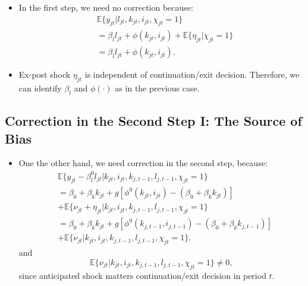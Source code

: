 \documentclass[
]{book}
\providecommand{\tightlist}{%
  \setlength{\itemsep}{0pt}\setlength{\parskip}{0pt}}
\begin{document}
\begin{itemize}
\tightlist
\item
  In the first step, we need no correction because:
  \begin{equation}
  \begin{split}
  &\mathbb{E}\{y_{jt}|l_{jt}, k_{jt}, i_{jt}, \chi_{jt} = 1 \}\\
  &=\beta_l l_{jt} + \phi(k_{jt}, i_{jt}) + \mathbb{E}\{\eta_{jt}|\chi_{jt} = 1\}\\
  &= \beta_l l_{jt} + \phi(k_{jt}, i_{jt}).
  \end{split}
  \end{equation}
\item
  Ex-post shock \(\eta_{jt}\) is independent of continuation/exit decision.
  Therefore, we can identify \(\beta_l\) and \(\phi(\cdot)\) as in the previous case.
\end{itemize}

\hypertarget{correction-in-the-second-step-i-the-source-of-bias}{%
\subsection{Correction in the Second Step I: The Source of Bias}\label{correction-in-the-second-step-i-the-source-of-bias}}

\begin{itemize}
\tightlist
\item
  One the other hand, we need correction in the second step, because:
  \begin{equation}
  \begin{split}
  &\mathbb{E}\{y_{jt} - \beta_l^0 l_{jt}|k_{jt}, i_{jt}, k_{j, t - 1}, l_{j, t - 1}, \chi_{jt} = 1\} \\
  &= \beta_0 + \beta_k k_{jt} + g[\phi^0(k_{jt}, i_{jt}) - (\beta_0 + \beta_k k_{jt})]\\
  & + \mathbb{E}\{\nu_{jt} + \eta_{jt}| k_{jt}, i_{jt}, k_{j, t - 1}, l_{j, t - 1}, \chi_{jt} = 1\}\\
  &= \beta_0 + \beta_k k_{jt} + g[\phi^0(k_{j, t - 1}, i_{j, t - 1}) - (\beta_0 + \beta_k k_{j, t - 1})]\\
  & + \mathbb{E}\{\nu_{jt}| k_{jt}, i_{jt}, k_{j, t - 1}, l_{j, t - 1} , \chi_{jt} = 1\}.
  \end{split}
  \end{equation}
  and
  \begin{equation}
  \mathbb{E}\{\nu_{jt}| k_{jt}, i_{jt}, k_{j, t - 1}, l_{j, t - 1}, \chi_{jt} = 1 \} \neq 0,
  \end{equation}
  since anticipated shock matters continuation/exit decision in period \(t\).
\end{itemize}
\end{document}
